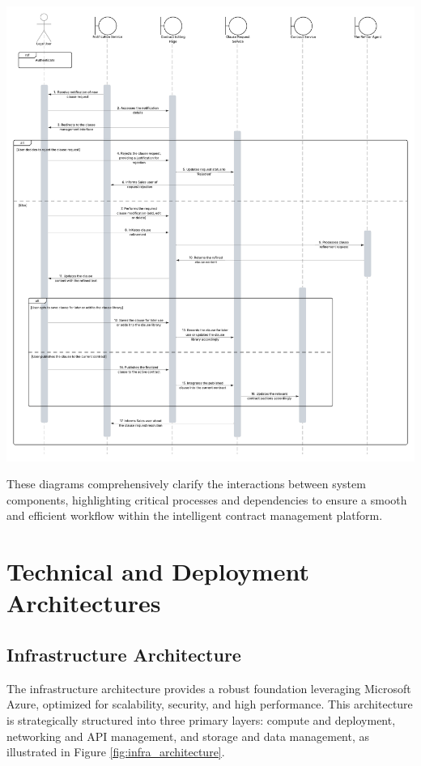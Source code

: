 \begin{center}
    \centering
    \includegraphics[width=1\textwidth]{Images/Sequence Diagram - Legal - Clause Request.png}
    \label{fig:sequence_diagram_clause_request_legal}
\end{center}

These diagrams comprehensively clarify the interactions between system components, highlighting critical processes and dependencies to ensure a smooth and efficient workflow within the intelligent contract management platform.

\section{Technical and Deployment Architectures}

\subsection{Infrastructure Architecture}
The infrastructure architecture provides a robust foundation leveraging Microsoft Azure, optimized for scalability, security, and high performance. This architecture is strategically structured into three primary layers: compute and deployment, networking and API management, and storage and data management, as illustrated in Figure \ref{fig:infra_architecture}.


